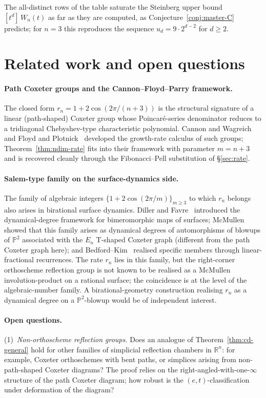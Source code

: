 \documentclass[11pt,a4paper]{article}
\theoremstyle{remark}
\theoremstyle{plain}
\begin{document}
The all-distinct rows of the table saturate the Steinberg upper bound
$[t^d]\, W_n(t)$ as far as they are computed, as
Conjecture~\ref{conj:master-C} predicts; for $n = 3$ this reproduces the
sequence $u_d = 9 \cdot 2^{d-2}$ for $d \ge 2$.

\section{Related work and open questions}\label{sec:related}

\paragraph{Path Coxeter groups and the Cannon--Floyd--Parry framework.}
The closed form $r_n = 1 + 2\cos(2\pi/(n+3))$ is the structural
signature of a linear (path-shaped) Coxeter group whose
Poincar\'e-series denominator reduces to a tridiagonal Chebyshev-type
characteristic polynomial.  Cannon and Wagreich~\cite{cannon-wagreich}
and Floyd and Plotnick~\cite{floyd-plotnick} developed the
growth-rate calculus of such groups; Theorem~\ref{thm:ndim-rate}
fits into their framework with parameter $m = n + 3$ and is
recovered cleanly through the Fibonacci--Pell substitution of
\S\ref{sec:rate}.

\paragraph{Salem-type family on the surface-dynamics side.}
The family of algebraic integers $\{ 1 + 2 \cos(2\pi/m)\}_{m \ge 3}$
to which $r_n$ belongs also arises in birational surface dynamics.
Diller and Favre~\cite{diller-favre} introduced the
dynamical-degree framework for bimeromorphic maps of surfaces;
McMullen~\cite{mcmullen-2007} showed that this family arises as
dynamical degrees of automorphisms of blowups of $\mathbb{P}^2$
associated with the $E_n$ T-shaped Coxeter graph (different from
the path Coxeter graph here); and Bedford--Kim~\cite{bedford-kim}
realised specific members through linear-fractional recurrences.
The rate $r_n$ lies in this family, but the right-corner orthoscheme
reflection group is not known to be realised as a McMullen
involution-product on a rational surface; the coincidence is at
the level of the algebraic-number family.  A birational-geometry
construction realising $r_n$ as a dynamical degree on a
$\mathbb{P}^2$-blowup would be of independent interest.

\paragraph{Open questions.}
(1)~\emph{Non-orthoscheme reflection groups.}  Does an analogue of
Theorem~\ref{thm:cd-general} hold for other families of simplicial
reflection chambers in $\mathbb{R}^n$: for example, Coxeter
orthoschemes with bent paths, or simplices arising from
non-path-shaped Coxeter diagrams?  The proof relies on the
right-angled-with-one-$\infty$ structure of the path Coxeter
diagram; how robust is the $(e, t)$-classification under deformation
of the diagram?
\end{document}
